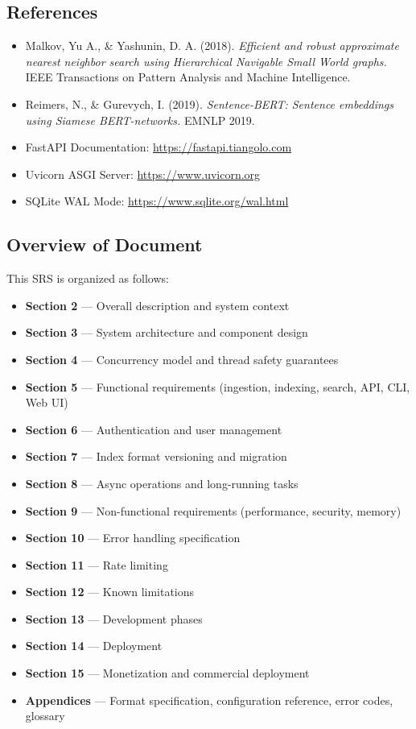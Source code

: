 \documentclass[11pt,a4paper]{article}
\begin{document}
\subsection{References}
\begin{itemize}
    \item Malkov, Yu A., \& Yashunin, D. A. (2018). \textit{Efficient and robust approximate nearest neighbor search using Hierarchical Navigable Small World graphs.} IEEE Transactions on Pattern Analysis and Machine Intelligence.
    \item Reimers, N., \& Gurevych, I. (2019). \textit{Sentence-BERT: Sentence embeddings using Siamese BERT-networks.} EMNLP 2019.
    \item FastAPI Documentation: \url{https://fastapi.tiangolo.com}
    \item Uvicorn ASGI Server: \url{https://www.uvicorn.org}
    \item SQLite WAL Mode: \url{https://www.sqlite.org/wal.html}
\end{itemize}

\subsection{Overview of Document}
This SRS is organized as follows:

\begin{itemize}
    \item \textbf{Section 2} --- Overall description and system context
    \item \textbf{Section 3} --- System architecture and component design
    \item \textbf{Section 4} --- Concurrency model and thread safety guarantees
    \item \textbf{Section 5} --- Functional requirements (ingestion, indexing, search, API, CLI, Web UI)
    \item \textbf{Section 6} --- Authentication and user management
    \item \textbf{Section 7} --- Index format versioning and migration
    \item \textbf{Section 8} --- Async operations and long-running tasks
    \item \textbf{Section 9} --- Non-functional requirements (performance, security, memory)
    \item \textbf{Section 10} --- Error handling specification
    \item \textbf{Section 11} --- Rate limiting
    \item \textbf{Section 12} --- Known limitations
    \item \textbf{Section 13} --- Development phases
    \item \textbf{Section 14} --- Deployment
    \item \textbf{Section 15} --- Monetization and commercial deployment
    \item \textbf{Appendices} --- Format specification, configuration reference, error codes, glossary
\end{itemize}
\end{document}
